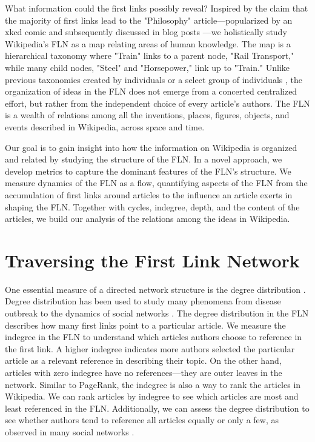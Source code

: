 \documentclass[pre,twocolumn,twoside,superscriptaddress,floatfix, aps, 10pt]{revtex4-1}
\begin{document}
What information could the first links possibly reveal?
Inspired by the claim that the majority of first links lead to the 
"Philosophy" article---popularized by an xkcd comic and subsequently
discussed in blog posts ---we holistically study 
Wikipedia's FLN as a map relating areas of human knowledge. 
The map is a hierarchical taxonomy where "Train" links to a parent node, 
"Rail Transport," while many child nodes, "Steel" and "Horsepower," link up to 
"Train." Unlike previous taxonomies
created by individuals
\cite{locke}
\cite{descartes}
\cite{aristotle} 
or a select group of individuals 
\cite{hist_thesaurus}, 
the organization of ideas in the FLN 
does not emerge from a concerted centralized effort, 
but rather from the independent choice of every article's authors.
The FLN is a wealth of relations among all the inventions, places,
figures, objects, and events described in Wikipedia, across space and time.


Our goal is to gain insight into how the information on Wikipedia is organized and related
by studying the structure of the FLN.
In a novel approach, we develop metrics to capture 
the dominant features of the FLN's structure.
We measure dynamics of the FLN as a flow, quantifying 
aspects of the FLN from the accumulation of first links around articles 
to the influence an article exerts in shaping the FLN.
Together with cycles, indegree, depth, and the content of the articles, 
we build our analysis of the relations among the ideas in Wikipedia.


\section{Traversing the First Link Network}

One essential measure of a directed network structure is the degree distribution 
\cite{newman}. 
Degree distribution has been used to study many phenomena from disease outbreak 
\cite{disease} 
to the dynamics of social networks 
\cite{social_nets}.
The degree distribution in the FLN describes how many first links point to a particular article. 
We measure the indegree in the FLN to understand which articles authors choose to reference in 
the first link.
A higher indegree indicates more authors selected the particular article
as a relevant reference in describing their topic. On the other hand, articles with zero 
indegree have no references---they are outer leaves in the network. 
Similar to PageRank, the indegree is also a way to rank the articles in Wikipedia.
We can rank articles by indegree to see which articles are most and least referenced in the FLN. 
Additionally, we can assess the degree distribution to see whether authors tend to reference all articles
equally or only a few, as observed in many social networks \cite{social_nets}.
\end{document}
